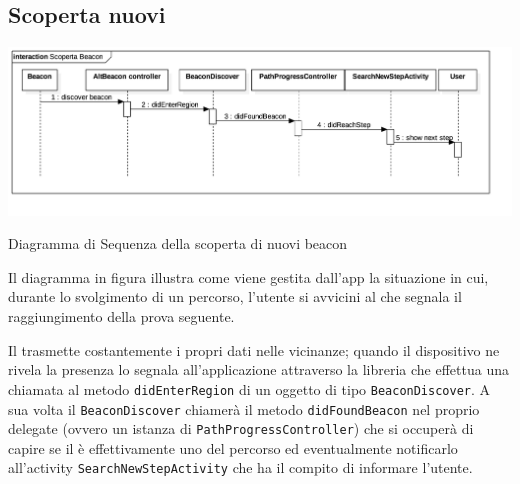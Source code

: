 \subsection{Scoperta nuovi }
\label{sub:Scoperta nuovi Beacon}

\includegraphics[scale=0.22]{img/diagrammiSequenza/scopertaBeacon.png}
\caption{Diagramma di Sequenza della scoperta di nuovi beacon}

Il diagramma in figura illustra come viene gestita dall'app la situazione in cui, durante lo svolgimento di un percorso, l'utente si avvicini al  che segnala il raggiungimento della prova seguente.

Il  trasmette costantemente i propri dati nelle vicinanze; quando il dispositivo ne rivela la presenza lo segnala all'applicazione attraverso la libreria  che effettua una chiamata al metodo \texttt{didEnterRegion} di un oggetto di tipo \texttt{BeaconDiscover}.
A sua volta il \texttt{BeaconDiscover} chiamerà il metodo \texttt{didFoundBeacon} nel proprio delegate (ovvero un istanza di \texttt{PathProgressController}) che si occuperà di capire se il  è effettivamente uno del percorso ed eventualmente notificarlo all'activity \texttt{SearchNewStepActivity} che ha il compito di informare l'utente.
